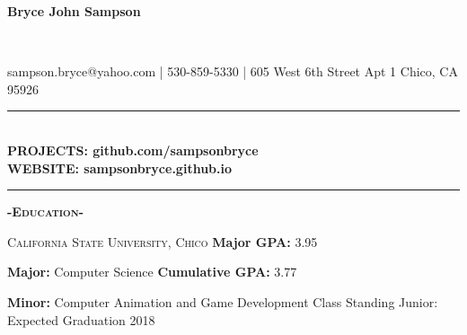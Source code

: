 \documentclass[12pt]{article}
\begin{document}
\center
\begin{Huge}\textbf{Bryce John Sampson}\end{Huge}\\
\medskip
\fontsize{12}{1.2}
\selectfont

\noindent
sampson.bryce@yahoo.com | 530-859-5330 | 605 West 6th Street Apt 1 Chico, CA 95926
\noindent\rule{17cm}{0.4pt}\\
\smallskip
\textbf{PROJECTS: \color{TealBlue}github.com/sampsonbryce}\\
\smallskip
\textbf{WEBSITE: \color{TealBlue}sampsonbryce.github.io}\\
\smallskip
\noindent\rule{17cm}{0.4pt}

\center
\textbf{\textsc{-Education-}}\\
\flushleft
\begin{footnotesize}
\textsc{California State University, Chico}
\hfill
\color{Cerulean}\textbf{Major GPA: }\color{black}3.95\\

\color{black}
\smallskip

\color{Cerulean}\textbf{Major: }\color{black}Computer Science
\hfill
\color{Cerulean}\textbf{Cumulative GPA: }\color{black}3.77\\
\smallskip

\color{Cerulean}\textbf{Minor: }\color{black}Computer Animation and Game Development
\hfill
\color{gray}Class Standing Junior: Expected Graduation 2018\\
\smallskip

\end{footnotesize}

\smallskip
\end{document}
